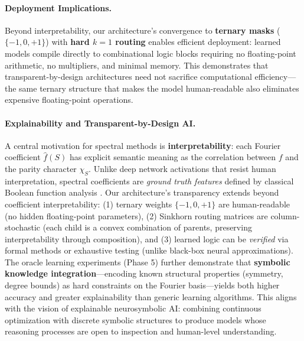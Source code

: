 \documentclass[Royal,times,sageh]{sagej}
\begin{document}
\paragraph{Deployment Implications.} Beyond interpretability, our architecture's convergence to \textbf{ternary masks} ($\{-1, 0, +1\}$) with \textbf{hard $k=1$ routing} enables efficient deployment: learned models compile directly to combinational logic blocks requiring no floating-point arithmetic, no multipliers, and minimal memory. This demonstrates that transparent-by-design architectures need not sacrifice computational efficiency---the same ternary structure that makes the model human-readable also eliminates expensive floating-point operations.

\paragraph{Explainability and Transparent-by-Design AI.} A central motivation for spectral methods is \textbf{interpretability}: each Fourier coefficient $\hat{f}(S)$ has explicit semantic meaning as the correlation between $f$ and the parity character $\chi_S$. Unlike deep network activations that resist human interpretation, spectral coefficients are \textit{ground truth features} defined by classical Boolean function analysis \cite{odonnell2014analysis}. Our architecture's transparency extends beyond coefficient interpretability: (1) ternary weights $\{-1,0,+1\}$ are human-readable (no hidden floating-point parameters), (2) Sinkhorn routing matrices are column-stochastic (each child is a convex combination of parents, preserving interpretability through composition), and (3) learned logic can be \textit{verified} via formal methods or exhaustive testing (unlike black-box neural approximations). The oracle learning experiments (Phase 5) further demonstrate that \textbf{symbolic knowledge integration}---encoding known structural properties (symmetry, degree bounds) as hard constraints on the Fourier basis---yields both higher accuracy and greater explainability than generic learning algorithms. This aligns with the vision of explainable neurosymbolic AI: combining continuous optimization with discrete symbolic structures to produce models whose reasoning processes are open to inspection and human-level understanding.
\end{document}
